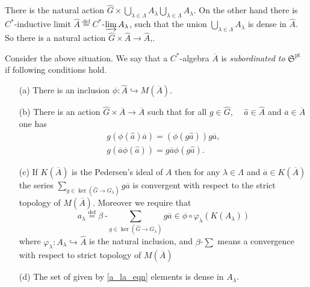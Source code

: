 \documentclass{beamer}
\theoremstyle{plain}
\newcommand{\be}{\begin{equation}}
\newcommand{\ee}{\end{equation}}
\newcommand{\la}{\lambda}
\newcommand{\La}{\Lambda}
\newcommand{\bt}{\beta}           %
\newcommand{\bydef}{\stackrel{\mathrm{def}}{=}}
\newcommand{\hookto}{\hookrightarrow}        %
\begin{document}
\begin{frame}
There is the natural action $\widehat{G}\times \bigcup_{\la\in \La} A_\la  \bigcup_{\la\in \La} A_\la$. On the other hand there is $C^*$-inductive limit $\widehat A \bydef C^*$-$\varinjlim A_\la$, such that the union $\bigcup_{\la\in \La} A_\la$ is dense in $\widehat A$. So there is a natural action $\widehat{G} \times \widehat{A}\to \widehat{A}$,.
\end{frame}
\begin{frame}

	Consider the above situation.  We say that a $C^*$-algebra $\overline A$ is \textit{ subordinated to}  $\mathfrak{S}^{\text{pt}}$ if following conditions hold.
	\begin{enumerate}
		\item [(a)] There is an inclusion $\phi: \widehat A \hookto M\left(\overline A\right)$.
		\item[(b)] There is an action $\widehat{G}\times \overline A \to \overline A$ such that
		for all $g \in \widehat{G}$,  $\quad \widehat a \in \widehat{A}$ and $\overline a \in \overline{A}$ one has
		\be\label{subord_ga_eqn}
		\begin{split}
			g\left(\phi\left(\widehat a \right)\overline{a}\right)  = 	\left(\phi\left(g\widehat a \right)\right) g \overline{a},\\
			g\left( \overline{a}\phi\left(\widehat a \right)\right) =g \overline{a}\phi\left(g\widehat a \right).
		\end{split}
		\ee
		\item[(c)] If $K\left( \overline{A}\right)$ is the Pedersen's ideal of $A$ then   for any $\la\in \La$  and $\overline a \in K\left( \overline{A}\right)$ the series $\sum_{g \in \ker\left(\widehat{G}\to G_\la\right)}g \overline a$ is convergent with respect to the strict topology of $M\left(\overline{A} \right)$. Moreover we require that
		\be\label{a_la_eqn}
		a_\la \bydef 	\bt~\text{-}\sum_{g \in \ker\left(\widehat{G}\to G_\la\right)}g \overline a \in \phi\circ \varphi_\la\left( K\left( A_\la\right) \right) 	
		\ee
		where $\varphi_\la : A_\la \hookto \widehat A$ is the natural inclusion, and $\bt$-$\sum$ means a convergence with respect to strict topology of $M\left( \overline A\right)$
		\item[(d)] The set of given by \eqref{a_la_eqn} elements is dense in $A_\la$.
	\end{enumerate}

\end{frame}
\end{document}
